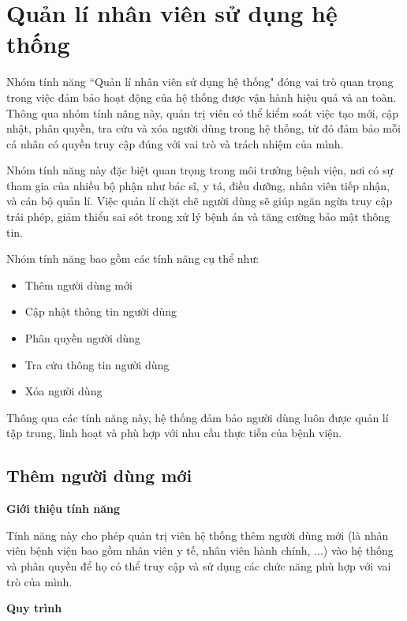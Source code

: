 \section{Quản lí nhân viên sử dụng hệ thống}

Nhóm tính năng ``Quản lí nhân viên sử dụng hệ thống" đóng vai trò quan trọng trong việc đảm bảo hoạt động của hệ thống được vận hành hiệu quả và an toàn. Thông qua nhóm tính năng này, quản trị viên có thể kiểm soát việc tạo mới, cập nhật, phân quyền, tra cứu và xóa người dùng trong hệ thống, từ đó đảm bảo mỗi cá nhân có quyền truy cập đúng với vai trò và trách nhiệm của mình.

Nhóm tính năng này đặc biệt quan trọng trong môi trường bệnh viện, nơi có sự tham gia của nhiều bộ phận như bác sĩ, y tá, điều dưỡng, nhân viên tiếp nhận, và cán bộ quản lí. Việc quản lí chặt chẽ người dùng sẽ giúp ngăn ngừa truy cập trái phép, giảm thiểu sai sót trong xử lý bệnh án và tăng cường bảo mật thông tin.

Nhóm tính năng bao gồm các tính năng cụ thể như:

\begin{itemize}
  \item Thêm người dùng mới
  \item Cập nhật thông tin người dùng
  \item Phân quyền người dùng
  \item Tra cứu thông tin người dùng
  \item Xóa người dùng
\end{itemize}

Thông qua các tính năng này, hệ thống đảm bảo người dùng luôn được quản lí tập trung, linh hoạt và phù hợp với nhu cầu thực tiễn của bệnh viện.

\subsection{Thêm người dùng mới}

\noindent \textbf{Giới thiệu tính năng}

Tính năng này cho phép quản trị viên hệ thống thêm người dùng mới (là nhân viên bệnh viện bao gồm nhân viên y tế, nhân viên hành chính, ...) vào hệ thống và phân quyền để họ có thể truy cập và sử dụng các chức năng phù hợp với vai trò của mình.

\noindent \textbf{Quy trình}

